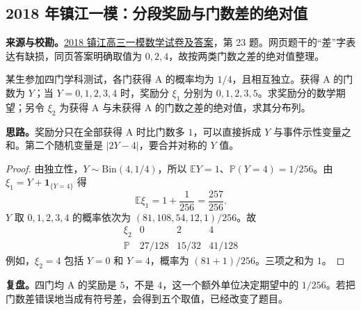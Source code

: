 \documentclass[UTF8]{ctexart}
\begin{document}
\subsection{2018 年镇江一模：分段奖励与门数差的绝对值}\label{sec:c2018zj1}
\textbf{来源与校勘。}\href{https://yn.qinxue100.com/news/gz/20180305/59236.html}{2018 镇江高三一模数学试卷及答案}，第 23 题。网页题干的“差”字表达有缺损，同页答案明确取值为 $0,2,4$，故按两类门数之差的绝对值整理。
\begin{example}[题意]
某生参加四门学科测试，各门获得 A 的概率均为 $1/4$，且相互独立。获得 A 的门数为 $Y$；当 $Y=0,1,2,3,4$ 时，奖励分 $\xi_1$ 分别为 $0,1,2,3,5$。求奖励分的数学期望；另令 $\xi_2$ 为获得 A 与未获得 A 的门数之差的绝对值，求其分布列。
\end{example}
\textbf{思路。}奖励分只在全部获得 A 时比门数多 $1$，可以直接拆成 $Y$ 与事件示性变量之和。第二个随机变量是 $|2Y-4|$，要合并对称的 $Y$ 值。
\begin{proof}
由独立性，$Y\sim\mathrm{Bin}(4,1/4)$，所以 $\mathbb EY=1$、$\mathbb P(Y=4)=1/256$。由 $\xi_1=Y+\mathbf1_{\{Y=4\}}$ 得
\[
\boxed{\mathbb E\xi_1=1+\frac1{256}=\frac{257}{256}}.
\]
$Y$ 取 $0,1,2,3,4$ 的概率依次为 $(81,108,54,12,1)/256$。故
\[
\begin{array}{c|ccc}
\xi_2&0&2&4\\\hline
\mathbb P&27/128&15/32&41/128
\end{array}
\]
例如，$\xi_2=4$ 包括 $Y=0$ 和 $Y=4$，概率为 $(81+1)/256$。三项之和为 $1$。
\end{proof}
\textbf{复盘。}四门均 A 的奖励是 $5$，不是 $4$，这一个额外单位决定期望中的 $1/256$。若把门数差错误地当成有符号差，会得到五个取值，已经改变了题目。
\end{document}

